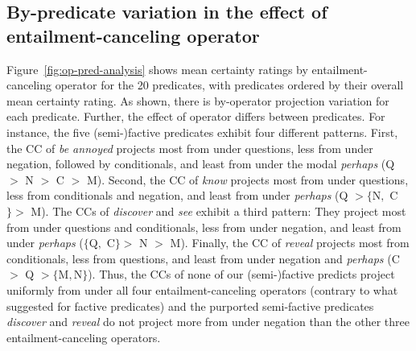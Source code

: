 \documentclass[a4paper,12pt,twoside]{article}
\begin{document}
	\subsection{By-predicate variation in the effect of entailment-canceling operator}\label{s:by-pred}

        Figure~\ref{fig:op-pred-analysis} shows mean certainty ratings by entailment-canceling operator for the 20 predicates, with predicates ordered by their overall mean certainty rating. As shown, there is by-operator projection variation for each predicate. Further, the effect of operator differs between predicates. For instance, the five (semi-)factive predicates exhibit four different patterns.
        First, the CC of \emph{be annoyed} projects
        most from under questions, less from under negation, followed by conditionals, and least from under the modal \emph{perhaps} (\textcolor{op-q-color}{Q} $>$ \textcolor{op-n-color}{N} $>$ \textcolor{op-c-color}{C} $>$ \textcolor{op-m-color}{M}).
        Second, the CC of \emph{know} projects most from under questions, less from conditionals and negation, and least from under {\em perhaps} (\textcolor{op-q-color}{Q} $> \{$\textcolor{op-n-color}{N}$,$ \textcolor{op-c-color}{C}$\} >$ \textcolor{op-m-color}{M}).
        The CCs of \emph{discover} and \emph{see} exhibit a third pattern: They project most from under questions and conditionals, less from under negation, and least from under \emph{perhaps} ($\{$\textcolor{op-q-color}{Q}$,$ \textcolor{op-c-color}{C}$\}>$ \textcolor{op-n-color}{N} $>$ \textcolor{op-m-color}{M}).
        Finally, the CC of \emph{reveal} projects most from conditionals, less from questions, and least from under negation and \emph{perhaps} (\textcolor{op-c-color}{C} $>$ \textcolor{op-q-color}{Q}  $> \{$\textcolor{op-m-color}{M}$, $\textcolor{op-n-color}{N}$\}$).
        Thus, the CCs of none of our (semi-)factive predicts project uniformly from under all four entailment-canceling operators (contrary to what \citealt{karttunen_observations_1971} suggested for factive predicates) and the purported semi-factive predicates  \emph{discover} and \emph{reveal} do not project more from under negation than the other three entailment-canceling operators. 
        
\end{document}
